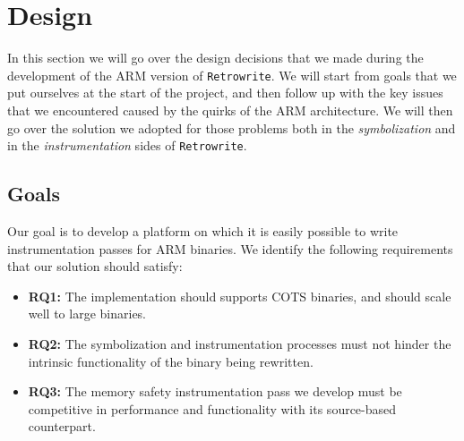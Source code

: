 \documentclass[a4paper,11pt,oneside]{report}
\newcommand{\todo}[1]{%
	\begingroup 
	\sethlcolor{cyan}%
	\hl{TODO: #1}%
	\endgroup
}
\begin{document}



\chapter{Design}

In this section we will go over the design decisions that we made during the 
development of the ARM version of \texttt{Retrowrite}. We will start from goals 
that we put ourselves at the start of the project, and then follow up with the 
key issues that we encountered caused by the quirks of the ARM architecture. We 
will then go over the solution we adopted for those problems both in the 
\emph{symbolization} and in the \emph{instrumentation} sides of 
\texttt{Retrowrite}. 

\section{Goals}


Our goal is to develop a platform on which it is easily possible to write 
instrumentation passes for ARM binaries.  We identify the following 
requirements that our solution should satisfy:

\begin{itemize}
	\item \textbf{RQ1:} The implementation should supports COTS binaries, and 
		should scale well to large binaries.
	\item \textbf{RQ2:} The symbolization and instrumentation processes must 
		not hinder the intrinsic functionality of the binary being rewritten.
	\item \textbf{RQ3:} The memory safety instrumentation pass we develop must 
		be competitive in performance and functionality with its source-based 
		counterpart.


\end{itemize}

	 
\end{document}
